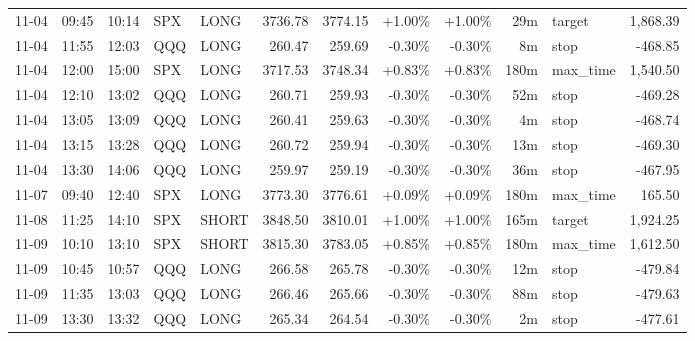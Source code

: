 \documentclass[11pt,a4paper]{article}
\begin{document}
\begin{center}
\begin{longtable}{>{\color{txtmain}}l l l l l r r r r r >{\color{txtmain}}l r}
11-04 & 09:45 & 10:14 & SPX & LONG & 3736.78 & 3774.15 & \textcolor{wingreen}{+1.00\%} & \textcolor{wingreen}{+1.00\%} & 29m & target & \textcolor{wingreen}{1,868.39} \\
11-04 & 11:55 & 12:03 & QQQ & LONG & 260.47 & 259.69 & \textcolor{lossred}{-0.30\%} & \textcolor{lossred}{-0.30\%} & 8m & stop & \textcolor{lossred}{-468.85} \\
11-04 & 12:00 & 15:00 & SPX & LONG & 3717.53 & 3748.34 & \textcolor{wingreen}{+0.83\%} & \textcolor{wingreen}{+0.83\%} & 180m & max\_time & \textcolor{wingreen}{1,540.50} \\
11-04 & 12:10 & 13:02 & QQQ & LONG & 260.71 & 259.93 & \textcolor{lossred}{-0.30\%} & \textcolor{lossred}{-0.30\%} & 52m & stop & \textcolor{lossred}{-469.28} \\
11-04 & 13:05 & 13:09 & QQQ & LONG & 260.41 & 259.63 & \textcolor{lossred}{-0.30\%} & \textcolor{lossred}{-0.30\%} & 4m & stop & \textcolor{lossred}{-468.74} \\
11-04 & 13:15 & 13:28 & QQQ & LONG & 260.72 & 259.94 & \textcolor{lossred}{-0.30\%} & \textcolor{lossred}{-0.30\%} & 13m & stop & \textcolor{lossred}{-469.30} \\
11-04 & 13:30 & 14:06 & QQQ & LONG & 259.97 & 259.19 & \textcolor{lossred}{-0.30\%} & \textcolor{lossred}{-0.30\%} & 36m & stop & \textcolor{lossred}{-467.95} \\
11-07 & 09:40 & 12:40 & SPX & LONG & 3773.30 & 3776.61 & \textcolor{wingreen}{+0.09\%} & \textcolor{wingreen}{+0.09\%} & 180m & max\_time & \textcolor{wingreen}{165.50} \\
11-08 & 11:25 & 14:10 & SPX & SHORT & 3848.50 & 3810.01 & \textcolor{wingreen}{+1.00\%} & \textcolor{wingreen}{+1.00\%} & 165m & target & \textcolor{wingreen}{1,924.25} \\
11-09 & 10:10 & 13:10 & SPX & SHORT & 3815.30 & 3783.05 & \textcolor{wingreen}{+0.85\%} & \textcolor{wingreen}{+0.85\%} & 180m & max\_time & \textcolor{wingreen}{1,612.50} \\
11-09 & 10:45 & 10:57 & QQQ & LONG & 266.58 & 265.78 & \textcolor{lossred}{-0.30\%} & \textcolor{lossred}{-0.30\%} & 12m & stop & \textcolor{lossred}{-479.84} \\
11-09 & 11:35 & 13:03 & QQQ & LONG & 266.46 & 265.66 & \textcolor{lossred}{-0.30\%} & \textcolor{lossred}{-0.30\%} & 88m & stop & \textcolor{lossred}{-479.63} \\
11-09 & 13:30 & 13:32 & QQQ & LONG & 265.34 & 264.54 & \textcolor{lossred}{-0.30\%} & \textcolor{lossred}{-0.30\%} & 2m & stop & \textcolor{lossred}{-477.61} \\

\end{longtable}
\end{center}
\end{document}
